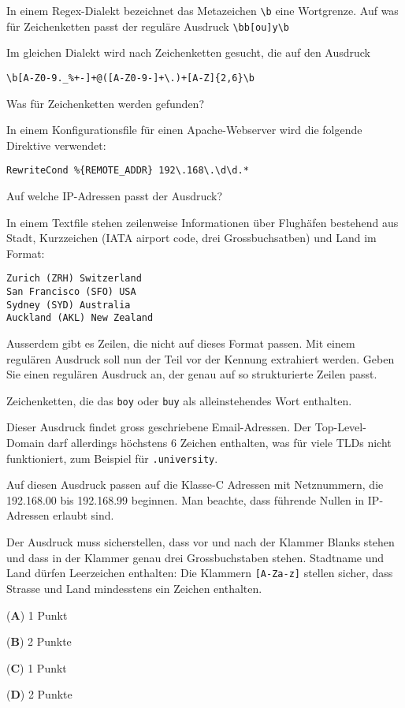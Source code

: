 \begin{teilaufgaben}
\item
In einem Regex-Dialekt bezeichnet das Metazeichen \texttt{\textbackslash{}b}
eine Wortgrenze.
Auf was für Zeichenketten passt der reguläre Ausdruck
\texttt{\textbackslash{}bb[ou]y\textbackslash{}b}
\item
Im gleichen Dialekt wird nach Zeichenketten gesucht, die auf den Ausdruck
\begin{verbatim}
\b[A-Z0-9._%+-]+@([A-Z0-9-]+\.)+[A-Z]{2,6}\b
\end{verbatim}
Was für Zeichenketten werden gefunden?
\item
In einem Konfigurationsfile für einen Apache-Webserver wird die folgende
Direktive verwendet:
\begin{verbatim}
RewriteCond %{REMOTE_ADDR} 192\.168\.\d\d.*
\end{verbatim}
Auf welche IP-Adressen passt der Ausdruck?
\item
In einem Textfile stehen zeilenweise Informationen über Flughäfen bestehend
aus Stadt, Kurzzeichen (IATA airport code, drei Grossbuchsatben) und Land
im Format:
\begin{verbatim}
Zurich (ZRH) Switzerland
San Francisco (SFO) USA
Sydney (SYD) Australia
Auckland (AKL) New Zealand
\end{verbatim}
Ausserdem gibt es Zeilen, die nicht auf dieses Format passen.
Mit einem regulären Ausdruck soll nun der Teil vor der Kennung extrahiert
werden. 
Geben Sie einen regulären Ausdruck an, der genau auf so strukturierte
Zeilen passt.
\end{teilaufgaben}


\begin{loesung}
\begin{teilaufgaben}
\item
Zeichenketten, die das \texttt{boy} oder \texttt{buy} als
alleinstehendes Wort enthalten.
\item
Dieser Ausdruck findet gross geschriebene Email-Adressen.
Der Top-Level-Domain darf allerdings höchstens 6 Zeichen enthalten,
was für viele TLDs nicht funktioniert, zum Beispiel für \texttt{.university}.
\item
Auf diesen Ausdruck passen auf die Klasse-C Adressen mit Netznummern, die
 192.168.00 bis 192.168.99 beginnen.
Man beachte, dass führende Nullen in IP-Adressen erlaubt sind.
\item
Der Ausdruck muss sicherstellen, dass vor und nach der Klammer Blanks stehen
und dass in der Klammer genau drei Grossbuchstaben stehen.
Stadtname und Land dürfen Leerzeichen enthalten:
Die Klammern \texttt{[A-Za-z]} stellen sicher, dass Strasse und Land
mindesstens ein Zeichen enthalten.
\end{teilaufgaben}
\end{loesung}

\begin{bewertung}
\begin{teilaufgaben}
\item ({\bf A}) 1 Punkt
\item ({\bf B}) 2 Punkte
\item ({\bf C}) 1 Punkt
\item ({\bf D}) 2 Punkte
\end{teilaufgaben}
\end{bewertung}


